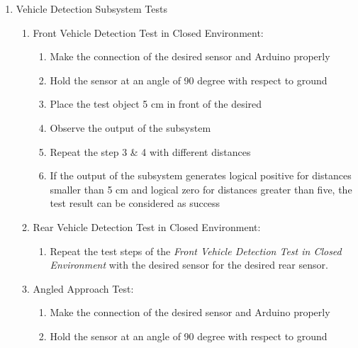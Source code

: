 \documentclass[a4paper,12pt]{article}
\begin{document}
\begin{enumerate}

\item {Vehicle Detection Subsystem Tests}\label{sect:vhd}


\begin{enumerate}


\item Front Vehicle Detection Test in Closed Environment:

\begin{enumerate}

\item Make the connection of the desired sensor and Arduino properly  

\item Hold the sensor at an angle of 90 degree with respect to ground  

\item Place the test object 5 cm in front of the desired  

\item Observe the output of the subsystem  

\item Repeat the step 3 \& 4 with different distances  

\item If the output of the subsystem generates logical positive for distances smaller than 5 cm and logical zero for distances greater than five, the test result can be considered as success  

\end{enumerate}					


\item Rear Vehicle Detection Test in Closed Environment:		

\begin{enumerate}

\item Repeat the test steps of the \textit{Front Vehicle Detection Test in Closed Environment} with the desired sensor for the desired rear sensor.   

\end{enumerate}


\item {Angled Approach Test:}

\begin{enumerate}

\item Make the connection of the desired sensor and Arduino properly  

\item Hold the sensor at an angle of 90 degree with respect to ground  


\end{enumerate}
\end{enumerate}
\end{enumerate}
\end{document}
